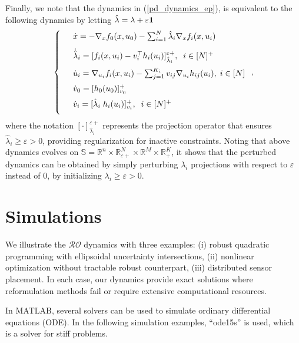 \documentclass[journal,twoside,web]{ieeecolor}
\newcommand{\rev}[1]{\textcolor{revisionblue}{#1}}
\begin{document}
Finally, we note that the dynamics in (\ref{pd_dynamics_ep}), is equivalent to the following dynamics by letting $\hat{\lambda}=\lambda+\varepsilon {\bf 1}$
\begin{align} \label{pd_dynamics_0}
\left\{
\begin{array}{cl}
\vspace{3mm}
&\dot x=-\nabla_x f_0(x,u_0)-\sum_{i=1}^N\hat{\lambda}_i \nabla_x f_i(x,u_i)\\
\vspace{2mm}
&\dot{\hat{\lambda}}_i=[f_i(x,u_i)-v_i^\top h_i(u_i)]_{\hat{\lambda}_i}^{\varepsilon +},\;\; i\in[N]^+\\
\vspace{2mm}
&\dot u_i=\nabla_{u_i}f_i(x,u_i)-\sum_{j=1}^{K_i} v_{ij} \nabla_{u_i} h_{ij}(u_i),\; i\in[N]\\
\vspace{2mm}
&\dot{v}_0=[h_0(u_0)]_{v_0}^+\\
\vspace{2mm}
&\dot v_i=[\hat{\lambda}_i \; h_i(u_i)]_{v_i}^+,\;\;i\in[N]^+
\end{array}\right.,
\end{align}
\rev{where the notation $[\cdot]_{\hat{\lambda}_i}^{\varepsilon+}$ represents the projection operator that ensures $\hat{\lambda}_i \geq \varepsilon > 0$, providing regularization for inactive constraints.}
Noting that above dynamics evolves on $\mathbb{S}= \mathbb{R}^n \times \mathbb{R}^N_{\varepsilon +} \times \mathbb{R}^M \times \mathbb{R}^K_+$, it shows that the perturbed dynamics can be obtained by simply perturbing $\lambda_i$ projections with respect to $\varepsilon$ instead of $0$, by initializing $\lambda_i \geq \varepsilon > 0$.


\section{Simulations}\label{section_simulations}



We illustrate the $\mathcal{RO}$ dynamics with three examples: (i) robust quadratic programming with ellipsoidal uncertainty intersections, (ii) nonlinear optimization without tractable robust counterpart, (iii) distributed sensor placement. In each case, our dynamics provide exact solutions where reformulation methods fail or require extensive computational resources.

In MATLAB, several solvers can be used to simulate ordinary differential equations (ODE). In the following simulation examples, ``ode15s'' is used, which is a solver for stiff problems.
\end{document}
